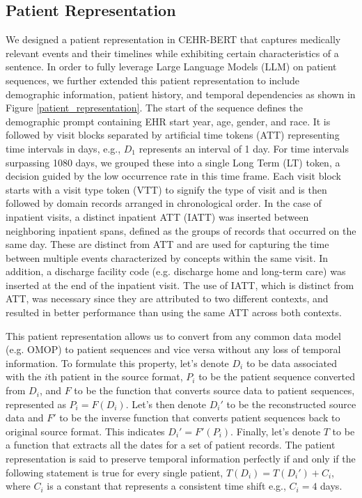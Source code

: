 \begin{multicols}{2}
\subsection{Patient Representation}
We designed a patient representation in CEHR-BERT \cite{Pang2021} that captures medically relevant events and their timelines while exhibiting certain characteristics of a sentence. In order to fully leverage Large Language Models (LLM) on patient sequences, we further extended this patient representation to include demographic information, patient history, and temporal dependencies as shown in Figure \ref{patient_representation}. The start of the sequence defines the demographic prompt containing EHR start year, age, gender, and race. It is followed by visit blocks separated by artificial time tokens (ATT) representing time intervals in days, e.g., \(D_1\) represents an interval of 1 day.  For time intervals surpassing 1080 days, we grouped these into a single Long Term (LT) token, a decision guided by the low occurrence rate in this time frame. Each visit block starts with a visit type token (VTT) to signify the type of visit and is then followed by domain records arranged in chronological order. In the case of inpatient visits, a distinct inpatient ATT (IATT) was inserted between neighboring inpatient spans, defined as the groups of records that occurred on the same day. These are distinct from ATT and are used for capturing the time between multiple events characterized by concepts within the same visit. In addition, a discharge facility code (e.g. discharge home and long-term care) was inserted at the end of the inpatient visit. The use of IATT, which is distinct from ATT, was necessary since they are attributed to two different contexts, and resulted in better performance than using the same ATT across both contexts.

This patient representation allows us to convert from any common data model (e.g. OMOP) to patient sequences and vice versa without any loss of temporal information. To formulate this property, let's denote \(D_i\) to be data associated with the \(i\)th patient in the source format, \(P_i\) to be the patient sequence converted from \(D_i\), and \(F\) to be the function that converts source data to patient sequences, represented as \(P_i = F(D_i)\). Let's then denote \(D_i'\) to be the reconstructed source data and \(F'\) to be the inverse function that converts patient sequences back to original source format. This indicates \(D_i' = F'(P_i)\). Finally, let's denote \(T\) to be a function that extracts all the dates for a set of patient records. The patient representation is said to preserve temporal information perfectly if and only if the following statement is true for every single patient, \(T(D_i) = T(D_i') + C_i\), where \(C_i\) is a constant that represents a consistent time shift e.g., \(C_i=4\) days.


\end{multicols}

